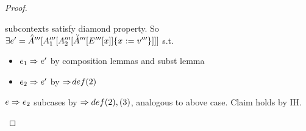\documentclass{article}
\begin{document}
\begin{proof}
\begin{byCases}
\begin{byCases}
    subcontexts satisfy diamond property.
    So $\exists 
        \e' = \inAp[''']{\inA[_1''']{\inA[_2''']{\substx{\inAm[''']{\Ex[''']}}
                                                        {\val'''}}}}$ s.t.
    \begin{itemize}
      \item $\e_1 \pstep \e'$ by composition lemmas and subst lemma
      \item $\e_2 \pstep \e'$ by $\pstep\!def(2)$
    \end{itemize}
  \end{byCases}
  \renewcommand{\byCasesCaseTemplate}[1]{\textbf{Case {#1}.}}
  $\e \pstep \e_2$ subcases by $\pstep def(2),(3)$, analogous to above case.
  Claim holds by IH.
\end{byCases}
\end{proof}
\end{document}
